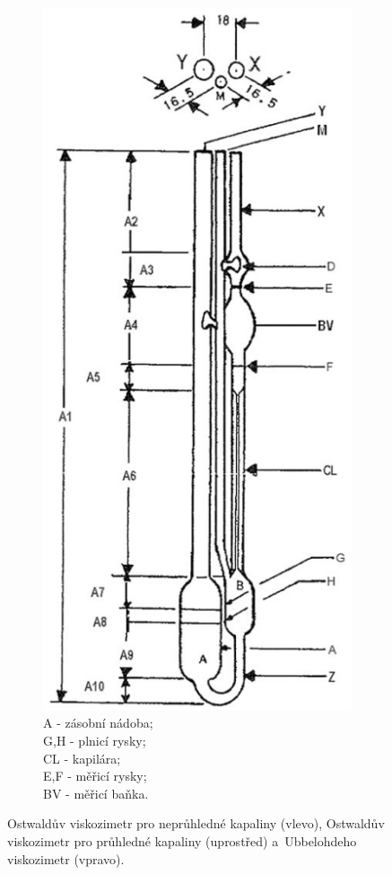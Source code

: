 \documentclass[12pt]{article}
\begin{document}
\begin{figure}
\begin{subfigure}[b]{.3\textwidth}
        \includegraphics[height=0.4\paperheight]{figures/ubbelohde.png}
        \caption{A - zásobní nádoba;\\G,H - plnicí rysky;\\CL - kapilára;\\E,F - měřicí rysky;\\BV - měřicí baňka.}
        \label{sfig:Ubbelohde}
    \end{subfigure}
    \caption{Ostwaldův viskozimetr pro neprůhledné kapaliny (vlevo), Ostwaldův viskozimetr pro průhledné kapaliny (uprostřed) a~Ubbelohdeho viskozimetr (vpravo).~\cite{book:Calibration_of_viscometers}}
    \label{fig:viskozimetry}
\end{figure} %
\end{document}

